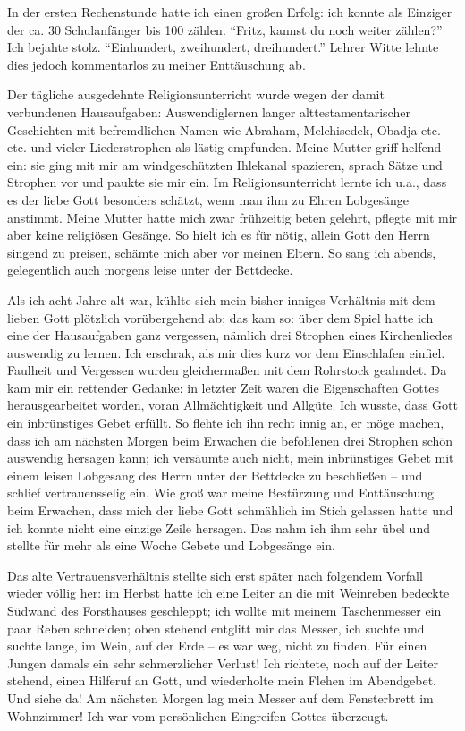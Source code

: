 In der ersten Rechenstunde hatte ich einen großen Erfolg: ich konnte als Einziger der ca. 30 Schulanfänger bis 100 zählen. \enquote{Fritz, kannst du noch weiter zählen?} Ich bejahte stolz. \enquote{Einhundert, zweihundert, dreihundert.} Lehrer Witte lehnte dies jedoch kommentarlos zu meiner Enttäuschung ab.

Der tägliche ausgedehnte Religionsunterricht wurde wegen der damit verbundenen Hausaufgaben: Auswendiglernen langer alttestamentarischer Geschichten mit befremdlichen Namen wie Abraham, Melchisedek, Obadja etc. etc. und vieler Liederstrophen als lästig empfunden. Meine Mutter griff helfend ein: sie ging mit mir am windgeschützten Ihlekanal spazieren, sprach Sätze und Strophen vor und paukte sie mir ein. Im Religionsunterricht lernte ich u.a., dass es der liebe Gott besonders schätzt, wenn man ihm zu Ehren Lobgesänge anstimmt. Meine Mutter hatte mich zwar frühzeitig beten gelehrt, pflegte mit mir aber keine religiösen Gesänge. So hielt ich es für nötig, allein Gott den Herrn singend zu preisen, schämte mich aber vor meinen Eltern. So sang ich abends, gelegentlich auch morgens leise unter der Bettdecke.

Als ich acht Jahre alt war, kühlte sich mein bisher inniges Verhältnis mit dem lieben Gott plötzlich vorübergehend ab; das kam so: über dem Spiel hatte ich eine der Hausaufgaben ganz vergessen, nämlich drei Strophen eines Kirchenliedes auswendig zu lernen. Ich erschrak, als mir dies kurz vor dem Einschlafen einfiel. Faulheit und Vergessen wurden gleichermaßen mit dem Rohrstock geahndet. Da kam mir ein rettender Gedanke: in letzter Zeit waren die Eigenschaften Gottes herausgearbeitet worden, voran Allmächtigkeit und Allgüte. Ich wusste, dass Gott ein inbrünstiges Gebet erfüllt. So flehte ich ihn recht innig an, er möge machen, dass ich am nächsten Morgen beim Erwachen die befohlenen drei Strophen schön auswendig hersagen kann; ich versäumte auch nicht, mein inbrünstiges Gebet mit einem leisen Lobgesang des Herrn unter der Bettdecke zu beschließen -- und schlief vertrauensselig ein. Wie groß war meine Bestürzung und Enttäuschung beim Erwachen, dass mich der liebe Gott schmählich im Stich gelassen hatte und ich konnte nicht eine einzige Zeile hersagen. Das nahm ich ihm sehr übel und stellte für mehr als eine Woche Gebete und Lobgesänge ein.

Das alte Vertrauensverhältnis stellte sich erst später nach folgendem Vorfall wieder völlig her: im Herbst hatte ich eine Leiter an die mit Weinreben bedeckte Südwand des Forsthauses geschleppt; ich wollte mit meinem Taschenmesser ein paar Reben schneiden; oben stehend entglitt mir das Messer, ich suchte und suchte lange, im Wein, auf der Erde -- es war weg, nicht zu finden. Für einen Jungen damals ein sehr schmerzlicher Verlust! Ich richtete, noch auf der Leiter stehend, einen Hilferuf an Gott, und wiederholte mein Flehen im Abendgebet. Und siehe da! Am nächsten Morgen lag mein Messer auf dem Fensterbrett im Wohnzimmer! Ich war vom persönlichen Eingreifen Gottes überzeugt.

